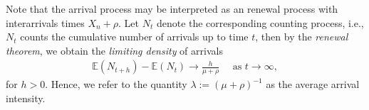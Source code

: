 \documentclass[a4paper]{report}
\theoremstyle{definition}
\theoremstyle{plain}
\begin{document}
Note that the arrival process may be interpreted as an renewal process with interarrivals
times $X_{n} + \rho$.
%
%
Let $N_{t}$ denote the corresponding counting process, i.e., $N_{t}$ counts the
cumulative number of arrivals up to time $t$, then by the \textit{renewal theorem}, we
obtain the \textit{limiting density} of arrivals
%
\begin{align*}
  \mathbb{E}(N_{t + h}) - \mathbb{E}(N_{t}) \rightarrow \frac{h}{\mu + \rho} \quad \text{ as } t \rightarrow \infty ,
\end{align*}
for $h > 0$. Hence, we refer to the quantity $\lambda := {(\mu + \rho)}^{-1}$ as the
average arrival intensity.

%
%
\end{document}
